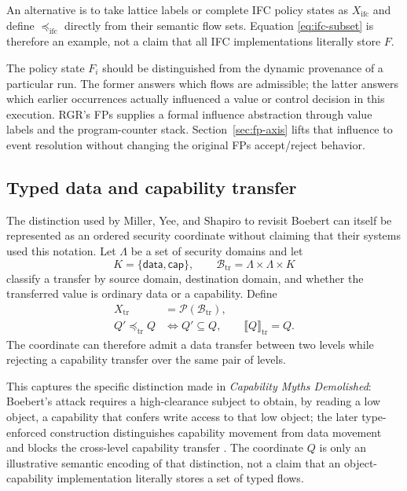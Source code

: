 \documentclass[10pt,twocolumn]{article}
\newcommand{\sem}[1]{\llbracket #1 \rrbracket}
\newcommand{\powerset}{\mathcal{P}}
\begin{document}
An alternative is to take lattice labels or complete IFC policy states as
$X_{\mathrm{ifc}}$ and define $\preceq_{\mathrm{ifc}}$ directly from their
semantic flow sets.  Equation \eqref{eq:ifc-subset} is therefore an example,
not a claim that all IFC implementations literally store $F$.


The policy state $F_i$ should be distinguished from the dynamic provenance of a
particular run. The former answers which flows are admissible; the latter
answers which earlier occurrences actually influenced a value or control
decision in this execution. RGR's FPs supplies a formal influence abstraction
through value labels and the program-counter stack. Section~\ref{sec:fp-axis}
lifts that influence to event resolution without changing the original FPs
accept/reject behavior.

\subsection{Typed data and capability transfer}

The distinction used by Miller, Yee, and Shapiro to revisit Boebert can itself
be represented as an ordered security coordinate without claiming that their
systems used this notation.  Let $\Lambda$ be a set of security domains and
let
\begin{equation}
  K=\{\mathsf{data},\mathsf{cap}\},
  \qquad
  \mathcal{B}_{\mathrm{tr}}=\Lambda\times\Lambda\times K
\end{equation}
classify a transfer by source domain, destination domain, and whether the
transferred value is ordinary data or a capability.  Define
\begin{align}
  X_{\mathrm{tr}}&=\powerset(\mathcal{B}_{\mathrm{tr}}),\\
  Q'\preceq_{\mathrm{tr}}Q
  &\Longleftrightarrow Q'\subseteq Q,
  \qquad
  \sem{Q}_{\mathrm{tr}}=Q.
\end{align}
The coordinate can therefore admit a data transfer between two levels while
rejecting a capability transfer over the same pair of levels.

This captures the specific distinction made in \emph{Capability Myths
Demolished}: Boebert's attack requires a high-clearance subject to obtain, by
reading a low object, a capability that confers write access to that low object;
the later type-enforced construction distinguishes capability movement from
data movement and blocks the cross-level capability transfer
\cite{miller_yee_shapiro2003}.  The coordinate $Q$ is only an illustrative
semantic encoding of that distinction, not a claim that an object-capability
implementation literally stores a set of typed flows.
\end{document}

